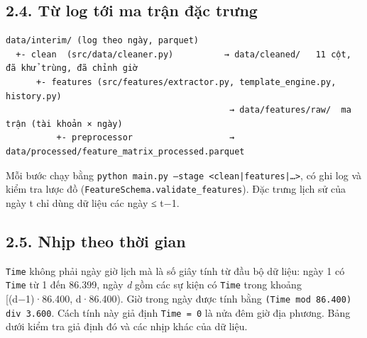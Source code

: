 \documentclass[
  11pt,
]{article}
\begin{document}
\hypertarget{tux1eeb-log-tux1edbi-ma-trux1eadn-ux111ux1eb7c-trux1b0ng}{%
\subsection{2.4. Từ log tới ma trận đặc
trưng}\label{tux1eeb-log-tux1edbi-ma-trux1eadn-ux111ux1eb7c-trux1b0ng}}

\begin{Verbatim}[breaklines,breakanywhere,fontsize=\footnotesize]
data/interim/ (log theo ngày, parquet)
  +- clean  (src/data/cleaner.py)          → data/cleaned/   11 cột, đã khử trùng, đã chỉnh giờ
      +- features (src/features/extractor.py, template_engine.py, history.py)
                                            → data/features/raw/  ma trận (tài khoản × ngày)
          +- preprocessor                   → data/processed/feature_matrix_processed.parquet
\end{Verbatim}

Mỗi bước chạy bằng
\texttt{python main.\allowbreak{}py --stage <clean|features|…>}, có ghi
log và kiểm tra lược đồ
(\texttt{FeatureSchema.\allowbreak{}validate\_\allowbreak{}features}).
Đặc trưng lịch sử của ngày t chỉ dùng dữ liệu các ngày ≤ t−1.

\hypertarget{nhux1ecbp-theo-thux1eddi-gian}{%
\subsection{2.5. Nhịp theo thời
gian}\label{nhux1ecbp-theo-thux1eddi-gian}}

\texttt{Time} không phải ngày giờ lịch mà là số giây tính từ đầu bộ dữ
liệu: ngày 1 có \texttt{Time} từ 1 đến 86.399, ngày \emph{d} gồm các sự
kiện có \texttt{Time} trong khoảng {[}(d−1)·86.400, d·86.400). Giờ trong
ngày được tính bằng
\texttt{(\allowbreak{}Time mod 86.\allowbreak{}400) div 3.\allowbreak{}600}.
Cách tính này giả định \texttt{Time =\allowbreak{} 0} là nửa đêm giờ địa
phương. Bảng dưới kiểm tra giả định đó và các nhịp khác của dữ liệu.
\end{document}
